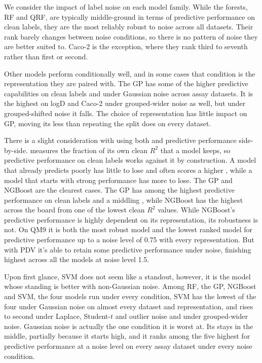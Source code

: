 We consider the impact of label noise on each model family. While the forests, RF and QRF, are typically middle-ground in terms of predictive performance on clean labels, they are the most reliably robust to noise across all datasets. Their rank barely changes between noise conditions, so there is no pattern of noise they are better suited to. Caco-2 is the exception, where they rank third to seventh rather than first or second.

Other models perform conditionally well, and in some cases that condition is the representation they are paired with. The GP has some of the higher predictive capabilities on clean labels and under Gaussian noise across assay datasets. It is the highest on logD and Caco-2 under grouped-wider noise as well, but under grouped-shifted noise it falls. The choice of representation has little impact on GP, moving its \aucnorm{} less than repeating the split does on every dataset.

There is a slight consideration with using both \aucnorm{} and predictive performance side-by-side. \aucnorm{} measures the fraction of its own clean $R^2$ that a model keeps, so predictive performance on clean labels works against it by construction. A model that already predicts poorly has little to lose and often scores a higher \aucnorm, while a model that starts with strong performance has more to lose. The GP and NGBoost are the clearest cases. The GP has among the highest predictive performance on clean labels and a middling \aucnorm, while NGBoost has the highest \aucnorm{} across the board from one of the lowest clean $R^2$ values. While NGBoost's predictive performance is highly dependent on its representation, its robustness is not. On QM9 it is both the most robust model and the lowest ranked model for predictive performance up to a noise level of 0.75 with every representation. But with PDV it's able to retain some predictive performance under noise, finishing highest across all the models at noise level 1.5.

Upon first glance, SVM does not seem like a standout, however, it is the model whose standing is better with non-Gaussian noise. Among RF, the GP, NGBoost and SVM, the four models run under every condition, SVM has the lowest \aucnorm{} of the four under Gaussian noise on almost every dataset and representation, and rises to second under Laplace, Student-$t$ and outlier noise and under grouped-wider noise. Gaussian noise is actually the one condition it is worst at. Its \aucnorm{} stays in the middle, partially because it starts high, and it ranks among the five highest for predictive performance at a noise level on every assay dataset under every noise condition.

